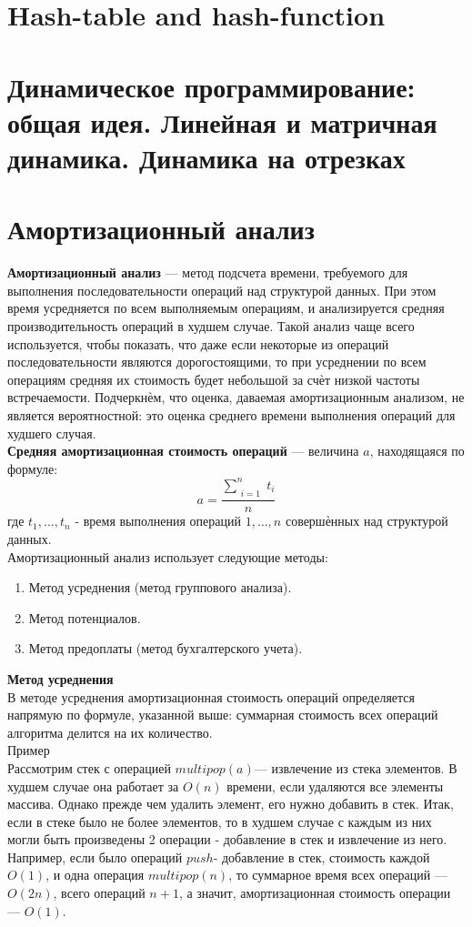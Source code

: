 \documentclass[a4paper]{article}
\begin{document}
\section{Hash-table and hash-function}

\section{Динамическое программирование: общая идея. Линейная и матричная динамика. Динамика на отрезках}

\section{Амортизационный анализ}
\textbf{Амортизационный анализ} — метод подсчета времени, требуемого для выполнения последовательности операций над структурой данных. При этом время усредняется по всем выполняемым операциям, и анализируется средняя производительность операций в худшем случае. Такой анализ чаще всего используется, чтобы показать, что даже если некоторые из операций последовательности являются дорогостоящими, то при усреднении по всем операциям средняя их стоимость будет небольшой за счѐт низкой частоты встречаемости. Подчеркнѐм, что оценка, даваемая амортизационным анализом, не является вероятностной: это оценка среднего времени выполнения операций для худшего случая. \\
\textbf{Средняя амортизационная стоимость операций} — величина $a$, находящаяся по формуле:
$$ a= \frac{\sum_{\substack{i=1}}^n t_i}{n} $$
где $t_1, \ldots, t_n$ - время выполнения операций $1, \ldots, n$ совершѐнных над структурой данных.\\
Амортизационный анализ использует следующие методы:
\begin{enumerate}
	\item Метод усреднения (метод группового анализа).
	\item Метод потенциалов.
	\item Метод предоплаты (метод бухгалтерского учета).
\end{enumerate}
\textbf{Метод усреднения} \\
В методе усреднения амортизационная стоимость операций определяется напрямую по формуле, указанной выше: суммарная стоимость всех операций алгоритма делится на их количество.\\
Пример\\
Рассмотрим стек с операцией $multipop(a)$— извлечение из стека элементов. В худшем случае она работает за $O(n)$ времени, если удаляются все элементы массива. Однако прежде чем удалить элемент, его нужно добавить в стек. Итак, если в стеке было не более элементов, то в худшем случае с каждым из них могли быть произведены 2 операции - добавление в стек и извлечение из него. Например, если было операций $push$- добавление в стек, стоимость каждой $O(1)$, и одна операция $multipop(n)$, то суммарное время всех операций — $O(2n)$, всего операций $n+1$, а значит, амортизационная стоимость операции — $O(1)$. \\
\end{document}
